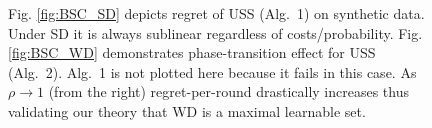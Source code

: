 \begin{center}
\begin{figure}[!bt]
\noindent
{\footnotesize Fig. \ref{fig:BSC_SD} depicts regret of USS (Alg.~1) on synthetic data. Under SD it is always sublinear regardless of costs/probability. Fig. \ref{fig:BSC_WD} demonstrates phase-transition effect for USS (Alg.~2). Alg.~1 is not plotted here because it fails in this case. As $\rho \rightarrow 1$ (from the right) regret-per-round drastically increases thus validating our theory that WD is a maximal learnable set. 
}
\end{figure}
\end{center}

